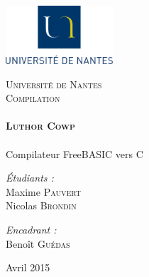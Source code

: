 \begin{titlepage}
 
	 \includegraphics[width=4cm]{figures/UN.png}~\\[1cm]
	\begin{center}
    \textsc{\LARGE Université de Nantes}\\[2cm]

    \textsc{\Large Compilation}\\[2cm]

    \HRule \\[0.4cm]
    { \huge \bfseries \textsc{Luthor Cowp}\\[0.4cm] }
    \HRule \\[2cm]
    
    {\LARGE Compilateur FreeBASIC vers C} 
	\\[6cm]

    \begin{minipage}{0.4\textwidth}
      \large
        \emph{\'Etudiants :}\\
        Maxime \textsc{Pauvert}\\
        Nicolas \textsc{Brondin}
    \end{minipage}
    \begin{minipage}{0.4\textwidth}
      \large
        \emph{Encadrant :}\\
         Benoît \textsc{Guédas}\\
    \end{minipage}

    \vfill

    {\large Avril 2015}

  \end{center}
\end{titlepage}
